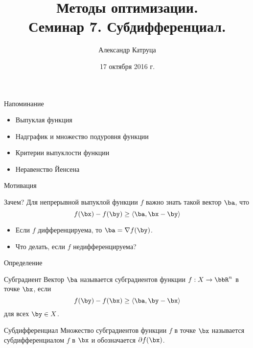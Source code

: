 \documentclass[12pt,russian]{beamer}
\title[Семинар 7]{Методы оптимизации. \\
 Семинар 7. Субдифференциал.}
\author{Александр Катруца}
\institute{Московский физико-технический институт,\\
Факультет Управления и Прикладной Математики}
\date{17 октября 2016 г.}
\begin{document}
\begin{frame}
\maketitle
\end{frame}

\begin{frame}{Напоминание}
\begin{itemize}
\item Выпуклая функция
\item Надграфик и множество подуровня функции
\item Критерии выпуклости функции
\item Неравенство Йенсена
\end{itemize}
\end{frame}

\begin{frame}{Мотивация}
\begin{block}{Зачем?}
Для непрерывной выпуклой функции $f$ важно знать такой вектор $\ba$, что
\vspace{-3mm} 
\[
f(\bx) - f(\by) \geq \langle \ba, \bx - \by \rangle
\]
\end{block}

\begin{itemize}
\item Если $f$ дифференцируема, то $\ba = \nabla f(\by)$.
\item Что делать, если $f$ недифференцируема?
\end{itemize}

\end{frame}

\begin{frame}{Определение}
\begin{block}{Субградиент}
Вектор $\ba$ называется субградиентов функции $f: X \rightarrow \bbR^n$ в точке $\bx$, если 
\vspace{-3mm}
\[
f(\by) - f(\bx) \geq \langle \ba, \by - \bx \rangle
\]
для всех $\by \in X$.
\end{block}

\begin{block}{Субдифференциал}
Множество субградиентов функции $f$ в точке $\bx$ называется субдифференциалом $f$ в $\bx$ и обозначается $\partial f(\bx)$.
\end{block}
\end{frame}
\end{document}
